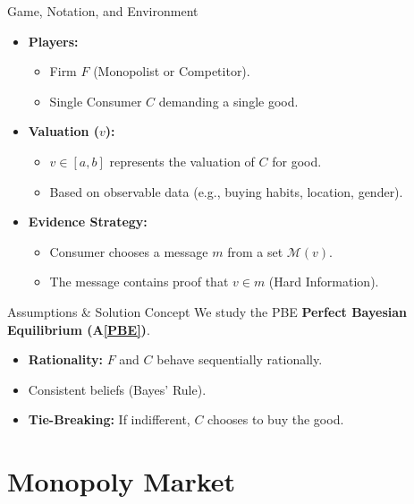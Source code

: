 \documentclass{beamer}
\begin{document}
    \begin{frame}{Game, Notation, and Environment}
    \begin{itemize}
        \item \textbf{Players:}
        \begin{itemize}
            \item Firm $F$ (Monopolist or Competitor).
            \item Single Consumer $C$ demanding a single good.\\
        \end{itemize}
        
        \item \textbf{Valuation ($v$):}
        \begin{itemize}
            \item $v \in [a,b]$ represents the valuation of $C$ for good.
            \item Based on observable data (e.g., buying habits, location, gender).
        \end{itemize}
        
        \item \textbf{Evidence Strategy:}
        \begin{itemize}
            \item Consumer chooses a message $m$ from a set $\mathcal{M}(v)$.
            \item The message contains proof that $v \in m$ (Hard Information).
        \end{itemize}
    \end{itemize}

    \begin{block}{Assumptions \& Solution Concept}
        We study the PBE \textbf{Perfect Bayesian Equilibrium (A\ref{PBE})}.
        \begin{itemize}
            \item \textbf{Rationality:} $F$ and $C$ behave sequentially rationally.
            \item Consistent beliefs (Bayes' Rule).
            \item \textbf{Tie-Breaking:} If indifferent, $C$ chooses to buy the good.
        \end{itemize}
    \end{block}
\end{frame}

\section{Monopoly Market}
\end{document}
